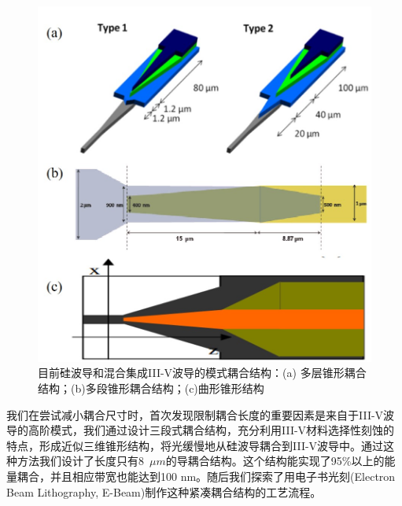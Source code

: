 \begin{figure}[htb]
	\centering
	\includegraphics[width=12cm]{./Pictures/fig_ch3_background_str.jpg}
	\caption{ 目前硅波导和混合集成III-V波导的模式耦合结构：(a) 多层锥形耦合结构\cite{kurczveil2013characterization}；(b)多段锥形耦合结构\cite{keyvaninia2009engineering}；(c)曲形锥形结构\cite{wang2012heterogeneous}}
	\label{fig_ch3_background_str}
\end{figure}

我们在尝试减小耦合尺寸时，首次发现限制耦合长度的重要因素是来自于III-V波导的高阶模式，我们通过设计三段式耦合结构，充分利用III-V材料选择性刻蚀的特点，形成近似三维锥形结构，将光缓慢地从硅波导耦合到III-V波导中。通过这种方法我们设计了长度只有8~$\mu m$的导耦合结构。这个结构能实现了95\%以上的能量耦合，并且相应带宽也能达到100 nm。随后我们探索了用电子书光刻(Electron Beam Lithography, E-Beam)制作这种紧凑耦合结构的工艺流程。
